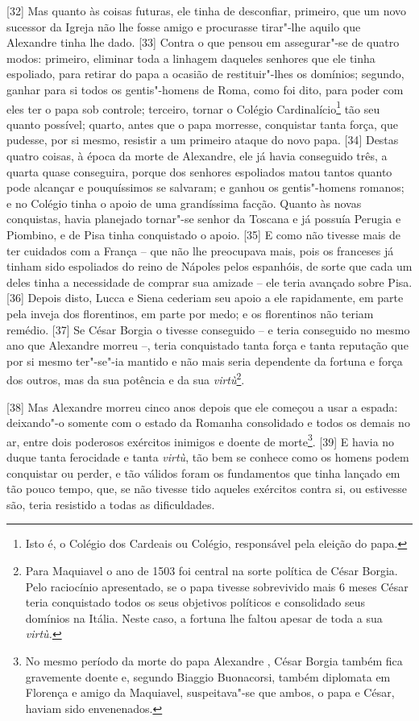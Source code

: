 {[}32{]} Mas quanto às coisas futuras, ele tinha de desconfiar,
primeiro, que um novo sucessor da Igreja não lhe fosse amigo e
procurasse tirar"-lhe aquilo que Alexandre tinha lhe dado. {[}33{]}
Contra o que pensou em assegurar"-se de quatro modos: primeiro, eliminar
toda a linhagem daqueles senhores que ele tinha espoliado, para retirar
do papa a ocasião de restituir"-lhes os domínios; segundo, ganhar para si
todos os gentis"-homens de Roma, como foi dito, para poder
com eles ter o papa sob controle; terceiro, tornar o Colégio
Cardinalício\footnote{Isto é, o Colégio dos Cardeais ou Colégio,
  responsável pela eleição do papa.} tão seu quanto possível; quarto,
antes que o papa morresse, conquistar tanta força, que pudesse, por si
mesmo, resistir a um primeiro ataque do novo papa. {[}34{]} Destas
quatro coisas, à época da morte de Alexandre, ele já havia conseguido
três, a quarta quase conseguira, porque dos senhores espoliados matou
tantos quanto pode alcançar e pouquíssimos se salvaram; e ganhou os
gentis"-homens romanos; e no Colégio tinha o apoio de uma grandíssima
facção. Quanto às novas conquistas, havia planejado tornar"-se senhor da
Toscana e já possuía Perugia e Piombino, e de Pisa tinha conquistado o
apoio. {[}35{]} E como não tivesse mais de ter cuidados com a França --
que não lhe preocupava mais, pois os franceses já tinham sido espoliados
do reino de Nápoles pelos espanhóis, de sorte que cada um deles tinha a
necessidade de comprar sua amizade -- ele teria avançado sobre Pisa.
{[}36{]} Depois disto, Lucca e Siena cederiam seu apoio a ele
rapidamente, em parte pela inveja dos florentinos, em parte por medo; e
os florentinos não teriam remédio. {[}37{]} Se César Borgia o tivesse
conseguido -- e teria conseguido no mesmo ano que Alexandre morreu --,
teria conquistado tanta força e tanta reputação que por si mesmo
ter"-se"-ia mantido e não mais seria dependente da fortuna e força dos
outros, mas da sua potência e da sua \emph{virtù}\footnote{Para
  Maquiavel o ano de 1503 foi central na sorte política de César Borgia.
  Pelo raciocínio apresentado, se o papa tivesse sobrevivido mais 6
  meses César teria conquistado todos os seus objetivos políticos e
  consolidado seus domínios na Itália. Neste caso, a fortuna lhe faltou
  apesar de toda a sua \emph{virtù.}}.

{[}38{]} Mas Alexandre morreu cinco anos depois que ele começou a usar a
espada: deixando"-o somente com o estado da Romanha consolidado e todos
os demais no ar, entre dois poderosos exércitos inimigos e doente de
morte\footnote{No mesmo período da morte do papa Alexandre , César
  Borgia também fica gravemente doente e, segundo Biaggio Buonacorsi,
  também diplomata em Florença e amigo da Maquiavel, suspeitava"-se que
  ambos, o papa e César, haviam sido envenenados.}. {[}39{]} E havia no
duque tanta ferocidade e tanta \emph{virtù}, tão bem se conhece como os
homens podem conquistar ou perder, e tão válidos foram os fundamentos
que tinha lançado em tão pouco tempo, que, se não tivesse tido aqueles
exércitos contra si, ou estivesse são, teria resistido a todas as
dificuldades.

